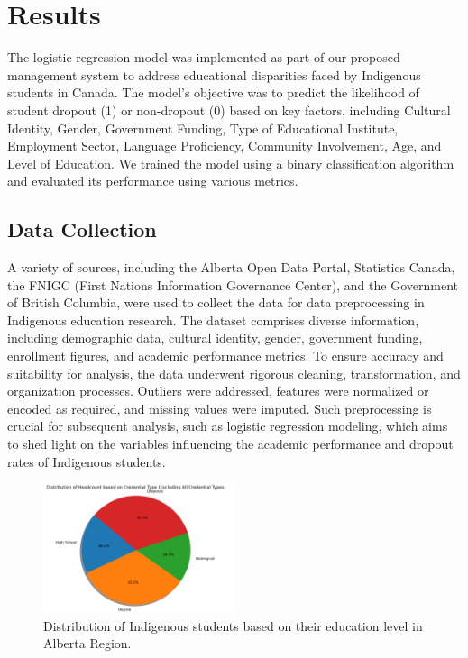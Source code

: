 \documentclass[a4paper,twoside]{article}
\begin{document}
\section{\uppercase{}{Results}}
\label{sec:Results}
The logistic regression model was implemented as part of our proposed management system to address educational disparities faced by Indigenous students in Canada. The model's objective was to predict the likelihood of student dropout (1) or non-dropout (0) based on key factors, including Cultural Identity, Gender, Government Funding, Type of Educational Institute, Employment Sector, Language Proficiency, Community Involvement, Age, and Level of Education. We trained the model using a binary classification algorithm and evaluated its performance using various metrics.

\subsection{Data Collection}

A variety of sources, including the Alberta Open Data Portal, Statistics Canada, the FNIGC (First Nations Information Governance Center), and the Government of British Columbia, were used to collect the data for data preprocessing in Indigenous education research. The dataset comprises diverse information, including demographic data, cultural identity, gender, government funding, enrollment figures, and academic performance metrics. To ensure accuracy and suitability for analysis, the data underwent rigorous cleaning, transformation, and organization processes. Outliers were addressed, features were normalized or encoded as required, and missing values were imputed. Such preprocessing is crucial for subsequent analysis, such as logistic regression modeling, which aims to shed light on the variables influencing the academic performance and dropout rates of Indigenous students.

 \begin{figure}[H]
    \centering 
    \includegraphics[width=0.5\textwidth, angle=0]{images/DataCollection.png}	
    \captionsetup{format=plain, justification=centering}
    \caption{Distribution of Indigenous students based on their education level in Alberta Region.}
    \label{fig:datacollection}
\end{figure}
\end{document}

